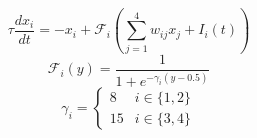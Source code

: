 \documentclass[11pt]{article}
\begin{document}
	\[\tau\frac{dx_i}{dt} = -x_i + \mathcal{F}_i\left(\sum_{j=1}^{4} w_{ij}x_j + I_i\left(t\right)\right)\]
	\[\mathcal{F}_i\left(y\right) = \frac{1}{1 + e^{-\gamma_i(y-0.5)}}\]
	\[\gamma_i =
		\begin{cases}
		8 & i\in \{ 1,2 \}\\
		15 & i\in \{ 3,4 \}
		\end{cases}
	\]
\end{document}
